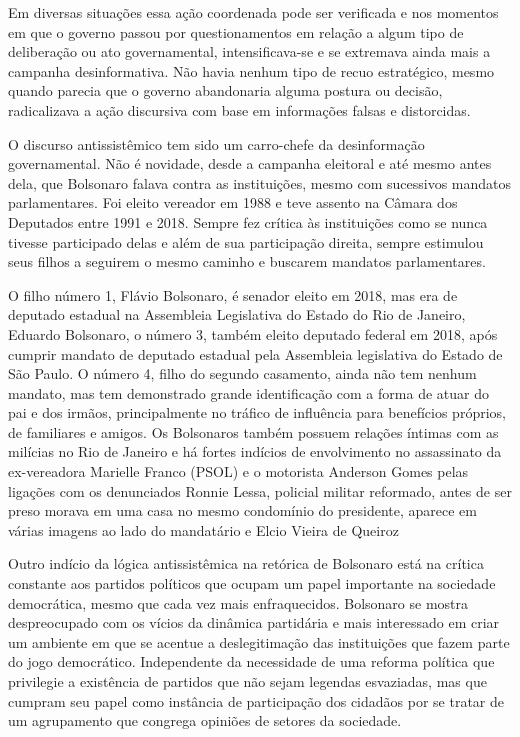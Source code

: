 Em diversas situações essa ação coordenada pode ser verificada e nos
momentos em que o governo passou por questionamentos em relação a algum
tipo de deliberação ou ato governamental, intensificava-se e se
extremava ainda mais a campanha desinformativa. Não havia nenhum tipo de
recuo estratégico, mesmo quando parecia que o governo abandonaria alguma
postura ou decisão, radicalizava a ação discursiva com base em
informações falsas e distorcidas.

O discurso antissistêmico tem sido um carro-chefe da desinformação
governamental. Não é novidade, desde a campanha eleitoral e até mesmo
antes dela, que Bolsonaro falava contra as instituições, mesmo com
sucessivos mandatos parlamentares. Foi eleito vereador em 1988 e teve
assento na Câmara dos Deputados entre 1991 e 2018. Sempre fez crítica às
instituições como se nunca tivesse participado delas e além de sua
participação direita, sempre estimulou seus filhos a seguirem o mesmo
caminho e buscarem mandatos parlamentares.

O filho número 1, Flávio Bolsonaro, é senador eleito em 2018, mas era de
deputado estadual na Assembleia Legislativa do Estado do Rio de Janeiro,
Eduardo Bolsonaro, o número 3, também eleito deputado federal em 2018,
após cumprir mandato de deputado estadual pela Assembleia legislativa do
Estado de São Paulo. O número 4, filho do segundo casamento, ainda não
tem nenhum mandato, mas tem demonstrado grande identificação com a forma
de atuar do pai e dos irmãos, principalmente no tráfico de influência
para benefícios próprios, de familiares e amigos. Os Bolsonaros também
possuem relações íntimas com as milícias no Rio de Janeiro e há fortes
indícios de envolvimento no assassinato da ex-vereadora Marielle Franco
(PSOL) e o motorista Anderson Gomes pelas ligações com os denunciados
Ronnie Lessa, policial militar reformado, antes de ser preso morava em
uma casa no mesmo condomínio do presidente, aparece em várias imagens ao
lado do mandatário e Elcio Vieira de Queiroz

Outro indício da lógica antissistêmica na retórica de Bolsonaro está na
crítica constante aos partidos políticos que ocupam um papel importante
na sociedade democrática, mesmo que cada vez mais enfraquecidos.
Bolsonaro se mostra despreocupado com os vícios da dinâmica partidária e
mais interessado em criar um ambiente em que se acentue a deslegitimação
das instituições que fazem parte do jogo democrático. Independente da
necessidade de uma reforma política que privilegie a existência de
partidos que não sejam legendas esvaziadas, mas que cumpram seu papel
como instância de participação dos cidadãos por se tratar de um
agrupamento que congrega opiniões de setores da sociedade.

